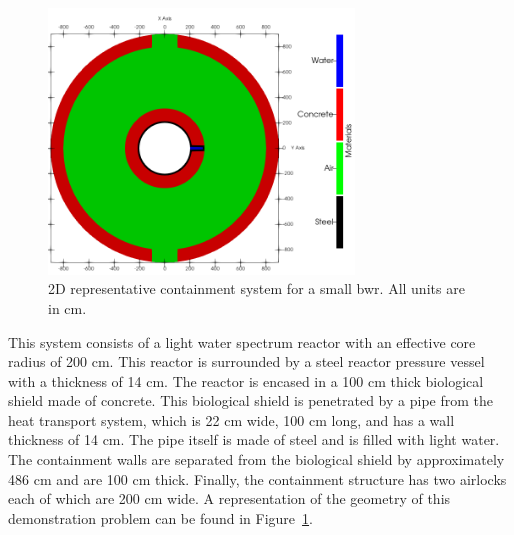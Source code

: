 \begin{figure}[H]
    \centering
    \includegraphics[width=0.725\textwidth]{images/demos/bwr_shield/geo.png}
    \caption{2D representative containment system for a small \acrshort{bwr}. All units are in cm.}
    \label{fig:demo:bwr:geo:cont_full}
\end{figure}

This system consists of a light water spectrum reactor with an effective core radius of 200 cm. This reactor is surrounded by a steel reactor pressure vessel with a thickness of 14 cm. The reactor is encased in a 100 cm thick biological shield made of concrete. This biological shield is penetrated by a pipe from the heat transport system, which is 22 cm wide, 100 cm long, and has a wall thickness of 14 cm. The pipe itself is made of steel and is filled with light water. The containment walls are separated from the biological shield by approximately 486 cm and are 100 cm thick. Finally, the containment structure has two airlocks each of which are 200 cm wide. A representation of the geometry of this demonstration problem can be found in Figure~\ref{fig:demo:bwr:geo:cont_full}.

